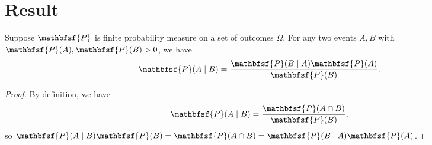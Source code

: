 

\section*{Result}

\begin{proposition}
Suppose $\mathbfsf{P} $ is finite probability measure on a set of outcomes $\Omega $.
For any two events $A, B$ with $\mathbfsf{P} (A), \mathbfsf{P} (B) > 0$, we have
  \[
\mathbfsf{P} (A \mid  B) = \frac{ \mathbfsf{P} (B \mid A)\mathbfsf{P} (A) }{ \mathbfsf{P} (B) }.
  \]
\begin{proof}By definition, we have
  \[
\mathbfsf{P} (A \mid  B) = \frac{ \mathbfsf{P} (A \cap  B) }{ \mathbfsf{P} (B) },
  \]
so $\mathbfsf{P} (A \mid  B) \mathbfsf{P} (B) = \mathbfsf{P} (A \cap  B) = \mathbfsf{P} (B \mid  A) \mathbfsf{P} (A)$.\end{proof}\end{proposition}
\blankpage